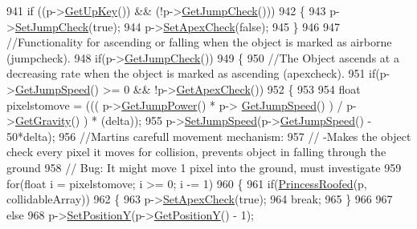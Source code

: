 \begin{DoxyCode}
941     \textcolor{keywordflow}{if} ((p->\hyperlink{classPrincessObject_ac480cd27ed76aeebff8035bab8e15861}{GetUpKey}()) && (!p->\hyperlink{classPrincessObject_aaf0b5e607b8c0303e667498809214b1d}{GetJumpCheck}()))
942     \{
943         p->\hyperlink{classPrincessObject_ac563d582ecc3fdf646c9e0c2af1936fb}{SetJumpCheck}(\textcolor{keyword}{true});
944         p->\hyperlink{classPrincessObject_a269f54cc9474075c1af91546f00f7779}{SetApexCheck}(\textcolor{keyword}{false});
945     \}
946 
947     \textcolor{comment}{//Functionality for ascending or falling when the object is marked as airborne (jumpcheck).}
948     \textcolor{keywordflow}{if}(p->\hyperlink{classPrincessObject_aaf0b5e607b8c0303e667498809214b1d}{GetJumpCheck}())
949     \{
950         \textcolor{comment}{//The Object ascends at a decreasing rate when the object is marked as ascending (apexcheck).}
951         \textcolor{keywordflow}{if}(p->\hyperlink{classPrincessObject_adec75a737450940ffc174e16350b17b6}{GetJumpSpeed}() >= 0 && !p->\hyperlink{classPrincessObject_ab05769e290142eed0d4d122bab7ea2e6}{GetApexCheck}())
952         \{
953 
954             \textcolor{keywordtype}{float} pixelstomove = ((( p->\hyperlink{classPrincessObject_ac66d11faaffaa464f795c2f664ba343a}{GetJumpPower}() * p->
      \hyperlink{classPrincessObject_adec75a737450940ffc174e16350b17b6}{GetJumpSpeed}() ) / p->\hyperlink{classPrincessObject_a341bb1d246698092d1dd2138dc0a0a9e}{GetGravity}() ) * (delta));
955             p->\hyperlink{classPrincessObject_ab2428d105c01f96ac469e9718e72aa6b}{SetJumpSpeed}(p->\hyperlink{classPrincessObject_adec75a737450940ffc174e16350b17b6}{GetJumpSpeed}() - 50*delta);
956             \textcolor{comment}{//Martins carefull movement mechanism:}
957             \textcolor{comment}{//  -Makes the object check every pixel it moves for collision, prevents object in falling
       through the ground}
958             \textcolor{comment}{//  Bug: It might move 1 pixel into the ground, must investigate}
959             \textcolor{keywordflow}{for}(\textcolor{keywordtype}{float} i = pixelstomove; i >= 0; i -= 1)
960             \{
961                 \textcolor{keywordflow}{if}(\hyperlink{classPhysics_a57d1b73db188d1399f7a2c7b5ce1a865}{PrincessRoofed}(p, collidableArray))
962                 \{
963                     p->\hyperlink{classPrincessObject_a269f54cc9474075c1af91546f00f7779}{SetApexCheck}(\textcolor{keyword}{true});
964                     \textcolor{keywordflow}{break};
965                 \}
966 
967                 \textcolor{keywordflow}{else}
968                     p->\hyperlink{classPrincessObject_a1b920b29beffdc9f5c776deea5a35c4d}{SetPositionY}(p->\hyperlink{classPrincessObject_ab467215d25ae8ea54e55888fc78222db}{GetPositionY}() - 1);

\end{DoxyCode}
